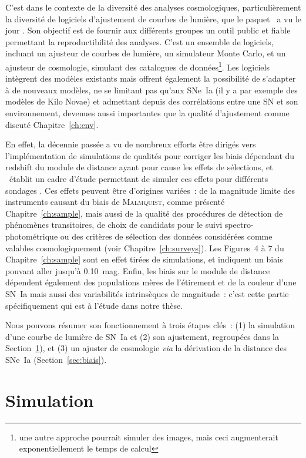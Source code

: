 \documentclass[../main/main.tex]{subfiles}
\begin{document}
C'est dans le contexte de la diversité des analyses cosmologiques,
particulièrement la diversité de logiciels d'ajustement de courbes de lumière,
que le paquet \snana\ a vu le jour \citep{kessler2009a}. Son objectif est de
fournir aux différents groupes un outil public et fiable permettant la
reproductibilité des analyses. C'est un ensemble de logiciels, incluant un
ajusteur de courbes de lumière, un simulateur Monte Carlo, et un ajusteur de
cosmologie, simulant des catalogues de données\footnote{une autre approche
    pourrait simuler des images, mais ceci augmenterait exponentiellement le
temps de calcul}. Les logiciels intègrent des modèles existants mais offrent
également la possibilité de s'adapter à de nouveaux modèles, ne se limitant
pas qu'aux SNe~Ia (il y a par exemple des modèles de Kilo Novae) et
admettant depuis des corrélations entre une SN et son environnement,
devenues aussi importantes que la qualité d'ajustement comme discuté
Chapitre~\ref{ch:env}.

En effet, la décennie passée a vu de nombreux efforts être dirigés vers
l'implémentation de simulations de qualités pour corriger les biais dépendant du
redshift du module de distance ayant pour cause les effets de sélections, et
\snana\ établit un cadre d'étude permettant de simuler ces effets pour
différents sondages \citep{kessler2019}. Ces effets peuvent être d'origines
variées~: de la magnitude limite des instruments causant du biais de
\textsc{Malmquist}, comme présenté Chapitre~\ref{ch:sample}, mais aussi de la
qualité des procédures de détection de phénomènes transitoires, de choix de
candidats pour le suivi spectro-photométrique ou des critères de sélection des
données considérées comme valables cosmologiquement (voir
Chapitre~\ref{ch:surveys}). Les Figures~4 à 7 du Chapitre~\ref{ch:sample} sont
en effet tirées de simulations, et indiquent un biais pouvant aller jusqu'à
\SI{0.10}{mag}. Enfin, les biais sur le module de distance dépendent également
des populations mères de l'étirement et de la couleur d'une SN~Ia mais aussi des
variabilités intrinsèques de magnitude~: c'est cette partie spécifiquement qui
est à l'étude dans notre thèse.

Nous pouvons résumer son fonctionnement à trois étapes clés~: (1) la simulation
d'une courbe de lumière de SN~Ia et (2) son ajustement, regroupées dans la
Section~\ref{sec:snanasim}), et (3) un ajuster de cosmologie \textit{via} la
dérivation de la distance des SNe~Ia (Section~\ref{sec:biais}).

\section{Simulation}\label{sec:snanasim}
\end{document}
